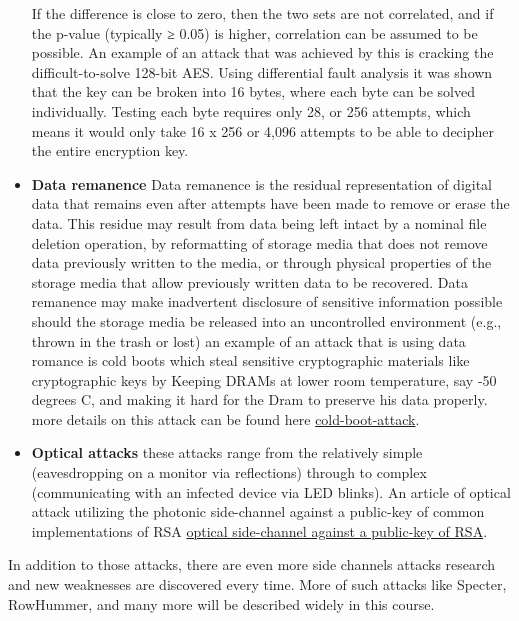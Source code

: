 \begin{itemize}
    If the difference is close to zero, then the two sets are not correlated, and if the p-value (typically ≥ 0.05) is higher, correlation can be assumed to be possible.
    An example of an attack that was achieved by this is cracking the difficult-to-solve 128-bit AES. 
    Using differential fault analysis it was shown that the key can be broken into 16 bytes, where each byte can be solved individually.
    Testing each byte requires only 28, or 256 attempts, which means it would only take 16 x 256 or 4,096 attempts to be able to decipher the entire encryption key. 
    \item \textbf{Data remanence} Data remanence is the residual representation of digital data that remains even after attempts have been made to remove or erase the data.
    This residue may result from data being left intact by a nominal file deletion operation, by reformatting of storage media that does not remove data previously written to the media,
    or through physical properties of the storage media that allow previously written data to be recovered.
    Data remanence may make inadvertent disclosure of sensitive information possible should the storage media be released into an uncontrolled environment (e.g., thrown in the trash or lost)
    an example of an attack that is using data romance is cold boots which steal sensitive cryptographic materials like cryptographic keys by Keeping DRAMs at lower room temperature,
    say -50 degrees C, and making it hard for the Dram to preserve his data properly.
    more details on this attack can be found here \href{https://resources.infosecinstitute.com/cold-boot-attack/#gref}{cold-boot-attack}.
    \item \textbf{Optical attacks} these attacks range from the relatively simple (eavesdropping on a monitor via reflections) through to complex (communicating with an infected device via LED blinks). 
    An article of optical attack utilizing the photonic side-channel against a public-key of common implementations of RSA \href{https://www.eng.tau.ac.il/~yash/ieee-host-2017.pdf}{optical side-channel against a public-key of RSA}.
\end{itemize}

In addition to those attacks, there are even more side channels attacks research and new weaknesses are discovered every time.
More of such attacks like Specter, RowHummer, and many more will be described widely in this course.

